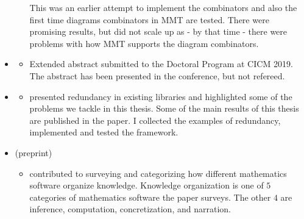 \begin{itemize}
\begin{itemize}
This was an earlier attempt to implement the combinators and also the first time diagrams combinators in MMT are tested.  There were promising results, but did not scale up as - by that time - there were problems with how MMT supports the diagram combinators. 
    \end{itemize}        
    \item \cite{cicm2019docotral} 
    \begin{itemize}
    \item[] Extended abstract submitted to the Doctoral Program at CICM 2019. The abstract has been presented in the conference, but not refereed. 
    \end{itemize}
    \item \cite{leverageCICM2020} 
    \begin{itemize}
    \item[]  presented redundancy in existing libraries and highlighted some of the problems we tackle in this thesis. Some of the main results of this thesis are published in the paper. I collected the examples of redundancy, implemented and tested the framework.
    \end{itemize} 
    \item \cite{bercic2020space} (preprint)
    \begin{itemize}
    \item[] contributed to surveying and categorizing how different mathematics software organize knowledge. Knowledge organization is one of $5$ categories of mathematics software the paper surveys. The other $4$ are inference, computation, concretization, and narration. 
    \end{itemize}        
\end{itemize}


